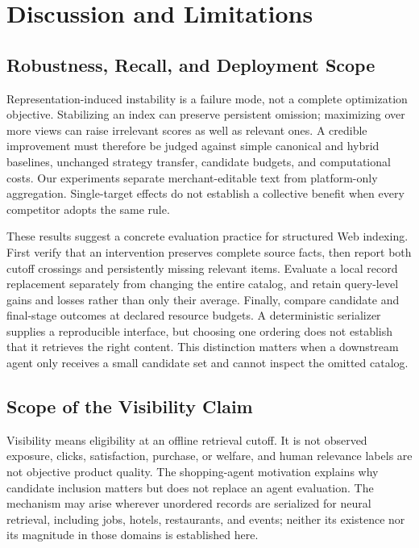 \section{Discussion and Limitations}
\subsection{Robustness, Recall, and Deployment Scope}
Representation-induced instability is a failure mode, not a complete optimization objective. Stabilizing an index can preserve persistent omission; maximizing over more views can raise irrelevant scores as well as relevant ones. A credible improvement must therefore be judged against simple canonical and hybrid baselines, unchanged strategy transfer, candidate budgets, and computational costs. Our experiments separate merchant-editable text from platform-only aggregation. Single-target effects do not establish a collective benefit when every competitor adopts the same rule.

These results suggest a concrete evaluation practice for structured Web indexing. First verify that an intervention preserves complete source facts, then report both cutoff crossings and persistently missing relevant items. Evaluate a local record replacement separately from changing the entire catalog, and retain query-level gains and losses rather than only their average. Finally, compare candidate and final-stage outcomes at declared resource budgets. A deterministic serializer supplies a reproducible interface, but choosing one ordering does not establish that it retrieves the right content. This distinction matters when a downstream agent only receives a small candidate set and cannot inspect the omitted catalog.

\subsection{Scope of the Visibility Claim}
Visibility means eligibility at an offline retrieval cutoff. It is not observed exposure, clicks, satisfaction, purchase, or welfare, and human relevance labels are not objective product quality. The shopping-agent motivation explains why candidate inclusion matters but does not replace an agent evaluation. The mechanism may arise wherever unordered records are serialized for neural retrieval, including jobs, hotels, restaurants, and events; neither its existence nor its magnitude in those domains is established here.

